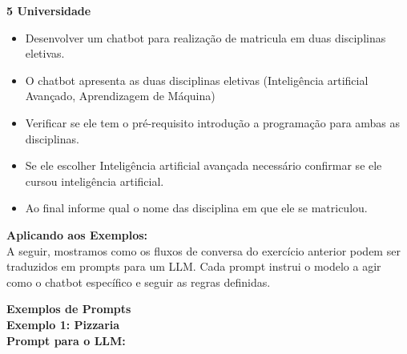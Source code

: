 \documentclass[14pt,a4paper,oneside]{book}
\begin{document}
\vspace{\baselineskip}

\textbf{5 Universidade} \\

\begin{itemize}[nosep]
	\item Desenvolver um chatbot para realização de matricula em duas disciplinas eletivas.
	\item O chatbot apresenta as duas disciplinas eletivas (Inteligência artificial Avançado, Aprendizagem de Máquina)
	\item Verificar se ele tem o pré-requisito introdução a programação para ambas as disciplinas.
	\item Se ele escolher Inteligência artificial avançada necessário confirmar se ele cursou inteligência artificial.
	\item Ao final informe qual o nome das disciplina em que ele se matriculou.
\end{itemize} 

\vspace{\baselineskip}

\textbf{Aplicando aos Exemplos:} \\

A seguir, mostramos como os fluxos de conversa do exercício anterior podem ser traduzidos em prompts para um LLM. Cada prompt instrui o modelo a agir como o chatbot específico e seguir as regras definidas.

\vspace{\baselineskip}

\textbf{Exemplos de Prompts} \\

\textbf{Exemplo 1: Pizzaria} \\

\textbf{Prompt para o LLM:} \\
\end{document}
